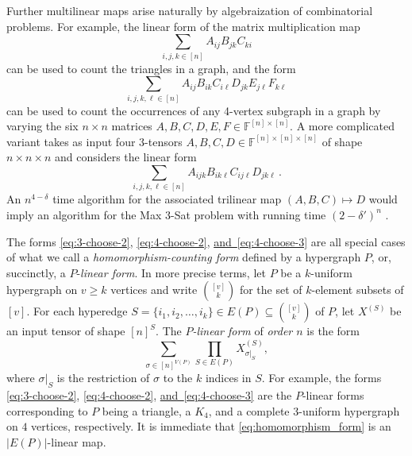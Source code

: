 \documentclass[11pt]{article}
\numberwithin{equation}{section}
\theoremstyle{definition}
\theoremstyle{plain}
\newcommand{\expeqref}[2]{\hyperref[#2]{#1~\eqref{#2}}}
\newcommand{\F}{\ensuremath{\mathbb{F}}}
\begin{document}
Further multilinear %
%
maps
%
arise
naturally by algebraization of combinatorial problems. For example,
the linear form of the matrix multiplication map
\begin{equation}
\label{eq:3-choose-2}
\sum_{i,j,k\in [n]}A_{ij}B_{jk}C_{ki}
\end{equation}
can be used to count the %
triangles in a graph, and the form
\begin{equation}
\label{eq:4-choose-2}
\sum_{i,j,k,\ell\in [n]}
A_{ij}B_{ik}C_{i\ell}D_{jk}E_{j\ell}F_{k\ell}
\end{equation}
can be used to count the %
occurrences of any 4-vertex subgraph in
a graph by varying the six $n\times n$ matrices
$A,B,C,D,E,F\in\F^{[n]\times [n]}$. A more complicated
variant takes as input four $3$-tensors
$A, B, C, D \in\F^{[n]\times [n]\times [n]}$
of shape $n\times n\times n$ and considers the linear form
\begin{equation}
\label{eq:4-choose-3}
\sum_{i,j,k,\ell\in [n]}
A_{ijk}B_{ik\ell}C_{ij\ell}D_{jk\ell}\,.
\end{equation}
An $n^{4-\delta}$ time algorithm for the associated trilinear map $(A, B, C) \mapsto D$ would imply an algorithm for the Max 3-Sat problem with running time $(2-\delta')^n$ \cite{Williams2005}.

The forms \eqref{eq:3-choose-2}, \eqref{eq:4-choose-2}, \expeqref{and}{eq:4-choose-3} are all special cases of what we call a \emph{homomorphism-counting form}
defined by a hypergraph $P$, or, succinctly, a $P$-\emph{linear form}.
In more precise terms, let $P$ be a $k$-uniform hypergraph on $v \ge k$ vertices and write $\binom{[v]}{k}$ for the set of $k$-element subsets of $[v]$.  For each hyperedge $S=\{i_1,i_2,\ldots,i_k\} \in E(P)\subseteq \binom{[v]}{k}$ of $P$, let $X^{(S)}$ be an input tensor of shape $[n]^S$.  The \emph{$P$-linear form} of \emph{order $n$} is the form
\begin{equation} \label{eq:homomorphism_form}
\sum_{\sigma \in [n]^{V(P)}} \prod_{S \in E(P)} X^{(S)}_{\sigma|_S},
\end{equation}
where $\sigma|_S$ is the restriction of $\sigma$ to the $k$ indices in $S$.
For example, the forms \eqref{eq:3-choose-2}, \eqref{eq:4-choose-2}, \expeqref{and}{eq:4-choose-3} are the $P$-linear forms corresponding to $P$ being a triangle, a $K_4$, and a complete $3$-uniform hypergraph on $4$ vertices, respectively.
It is immediate that \eqref{eq:homomorphism_form} is an $|E(P)|$-linear map.
\end{document}
